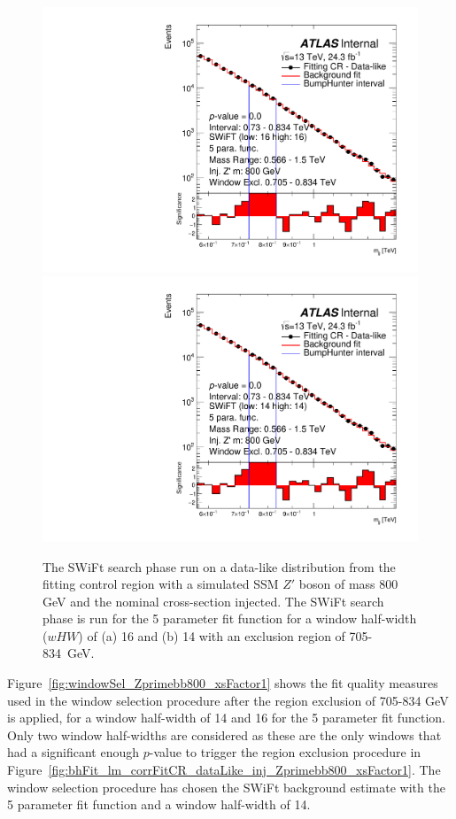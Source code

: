 \begin{figure}[!htb]
\captionsetup[subfigure]{aboveskip=0pt,justification=centering}
\centering
{} {
  \includegraphics[width=0.45\linewidth, angle=0]{figs/Dibjet/LowMass/FitStudy_min566/bhFit_corrFitCR_dataLike_5para_low16_high16_inj_Zprimebb800_xsFactor1_removedWindow.pdf}
}
 {
  \includegraphics[width=0.45\linewidth, angle=0]{figs/Dibjet/LowMass/FitStudy_min566/bhFit_corrFitCR_dataLike_5para_low14_high14_inj_Zprimebb800_xsFactor1_removedWindow.pdf}
}

\caption{\label{fig:bhFit_lm_corrFitCR_dataLike_inj_Zprimebb800_xsFactor1_removedWindow}
  The SWiFt search phase run on a data-like distribution
  from the fitting control region with a simulated SSM $Z'$ boson of mass 800 GeV and the nominal cross-section injected.
  The SWiFt search phase is run for the 5 parameter fit function for a window half-width ($wHW$) of (a) 16 and (b) 14
  with an exclusion region of 705-834~GeV.}
\end{figure}

Figure~\ref{fig:windowSel_Zprimebb800_xsFactor1} shows the fit quality measures used in the window selection procedure after the region exclusion of 705-834 GeV is applied,
for a window half-width of 14 and 16 for the 5 parameter fit function.
Only two window half-widths are considered as these are the only windows that had a significant enough $p$-value to trigger the region exclusion procedure in
Figure~\ref{fig:bhFit_lm_corrFitCR_dataLike_inj_Zprimebb800_xsFactor1}.
The window selection procedure has chosen the SWiFt background estimate with the 5 parameter fit function and a window half-width of 14.

